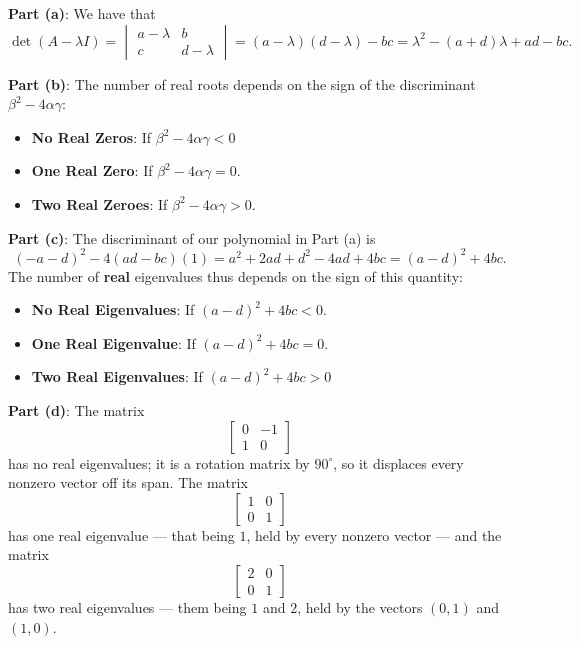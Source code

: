 \documentclass[11pt]{article}
\begin{document}
\textbf{Part (a)}: We have that
\[
	\det(A - \lambda I) = \begin{vmatrix} a - \lambda & b \\ c & d - \lambda \end{vmatrix} = (a - \lambda)(d - \lambda) - bc = \boxed{\lambda^{2} - (a + d) \lambda + ad - bc}.
\]

\textbf{Part (b)}: The number of real roots depends on the sign of the discriminant $\beta^{2} - 4\alpha\gamma$:
\begin{itemize}
	\item \textbf{No Real Zeros}: If $\beta^{2} - 4\alpha \gamma < 0$
	\item \textbf{One Real Zero}: If $\beta^{2} - 4\alpha \gamma = 0$.
	\item \textbf{Two Real Zeroes}: If $\beta^{2} - 4\alpha \gamma > 0$.
\end{itemize}

\textbf{Part (c)}: The discriminant of our polynomial in Part (a) is
\[
	(- a - d)^{2} - 4(ad - bc)(1) = a^{2} + 2ad + d^{2} - 4ad + 4bc = (a - d)^{2} + 4bc.
\]
The number of \textbf{real} eigenvalues thus depends on the sign of this quantity:
\begin{itemize}
	\item \textbf{No Real Eigenvalues}: If $(a - d)^{2} + 4bc < 0$.
	\item \textbf{One Real Eigenvalue}: If $(a - d)^{2} + 4bc = 0$.
	\item \textbf{Two Real Eigenvalues}: If $(a - d)^{2} + 4bc > 0$
\end{itemize}

\textbf{Part (d)}: The matrix
\[
	\begin{bmatrix} 0 & -1 \\ 1 & 0 \end{bmatrix}
\]
has no real eigenvalues; it is a rotation matrix by $90^{\circ}$, so it displaces every nonzero vector off its span. The matrix
\[
	\begin{bmatrix} 1 & 0 \\ 0 & 1 \end{bmatrix}
\]
has one real eigenvalue --- that being $1$, held by every nonzero vector --- and the matrix
\[
	\begin{bmatrix} 2 & 0 \\ 0 & 1 \end{bmatrix}
\]
has two real eigenvalues --- them being $1$ and $2$, held by the vectors $(0, 1)$ and $(1, 0)$.

\end{document}
